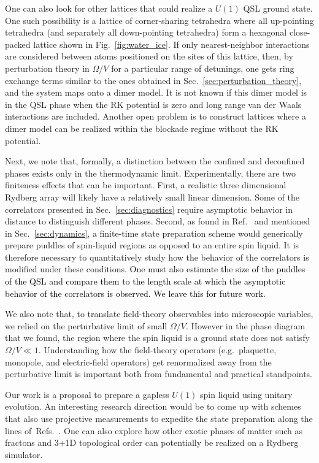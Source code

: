 \documentclass[twocolumn,superscriptaddress,amsmath,amssymb,aps,prx,nofootinbib]{revtex4-2}
\newcommand{\newtext}[1]{\textcolor{black}{#1}}
\begin{document}
One can also look for other lattices that could realize a $U(1)$ QSL ground state. One such possibility is a lattice of corner-sharing tetrahedra where all up-pointing tetrahedra (and separately all down-pointing tetrahedra) form a hexagonal close-packed lattice shown in Fig.~\ref{fig:water_ice}. If only nearest-neighbor interactions are considered between atoms positioned on the sites of this lattice, then, by perturbation theory in $\Omega/V$ for a particular range of detunings, one gets ring exchange terms similar to the ones obtained in Sec.~\ref{sec:perturbation_theory}, and the system maps onto a dimer model. It is not known if this dimer model is in the QSL phase when the RK potential is zero and long range van der Waals interactions are included. Another open problem is to construct lattices where a dimer model can be realized within the blockade regime without the RK potential.

Next, we note that, formally, a distinction between the confined and deconfined phases exists only in the thermodynamic limit. Experimentally, there are two finiteness effects that can be important. First, a realistic three dimensional Rydberg array will likely have a relatively small linear dimension.  
Some of the correlators presented in Sec.~\ref{sec:diagnostics} require asymptotic behavior in distance to distinguish different phases. Second, as found in Ref.~\cite{sahay2022quantum} and mentioned in Sec.~\ref{sec:dynamics}, a finite-time state preparation scheme would generically prepare puddles of spin-liquid regions as opposed to an entire spin liquid. It is therefore necessary to quantitatively study how the behavior of the correlators is modified under these conditions. \newtext{One must also estimate the size of the puddles of the QSL and compare them to the length scale at which the asymptotic behavior of the correlators is observed. We leave this for future work.} 

We also note that, to translate field-theory observables into microscopic variables, we relied on the perturbative limit of small $\Omega/V$. However in the phase diagram that we found, the region where the spin liquid is a ground state does not satisfy $\Omega/V\ll1$. Understanding how the field-theory operators (e.g.~plaquette, monopole, and electric-field operators) get renormalized away from the perturbative limit is important both from fundamental and practical standpoints.

Our work is a proposal to prepare a gapless $U(1)$ spin liquid using unitary evolution. An interesting research direction would be to come up with schemes that also use projective measurements to expedite the state preparation along the lines of~Refs.~\cite{tantivasadakarn2022shortest,lavasani2022monitored}. One can also explore how other exotic phases of matter such as fractons and 3+1D topological order can potentially be realized on a Rydberg simulator.
\end{document}
